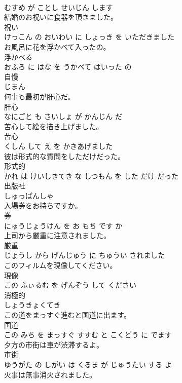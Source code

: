 \documentclass[8pt]{extreport}
\begin{document}
\begin{CJK}{UTF8}{min}
\\	むすめ が ことし せいじん します			
\\	結婚のお祝いに食器を頂きました。	
\\	祝い 
\\	けっこん の おいわい に しょっき を いただきました			
\\	お風呂に花を浮かべて入ったの。	
\\	浮かべる 
\\	おふろ に はな を うかべて はいった の			
\\	自慢	
\\	じまん			
\\	何事も最初が肝心だ。	
\\	肝心 
\\	なにごと も さいしょ が かんじん だ			
\\	苦心して絵を描き上げました。	
\\	苦心 
\\	くしん して え を かきあげました			
\\	彼は形式的な質問をしただけだった。	
\\	形式的 
\\	かれ は けいしきてき な しつもん を した だけ だった			
\\	出版社	
\\	しゅっぱんしゃ			
\\	入場券をお持ちですか。	
\\	券 
\\	にゅうじょうけん を お もち です か			
\\	上司から厳重に注意されました。	
\\	厳重 
\\	じょうし から げんじゅう に ちゅうい されました			
\\	このフィルムを現像してください。	
\\	現像 
\\	この ふぃるむ を げんぞう して ください			
\\	消極的	
\\	しょうきょくてき			
\\	この道をまっすぐ進むと国道に出ます。	
\\	国道 
\\	この みち を まっすぐ すすむ と こくどう に でます			
\\	夕方の市街は車が渋滞するよ。	
\\	市街 
\\	ゆうがた の しがい は くるま が じゅうたい する よ			
\\	火事は無事消火されました。	

\end{CJK}
\end{document}
